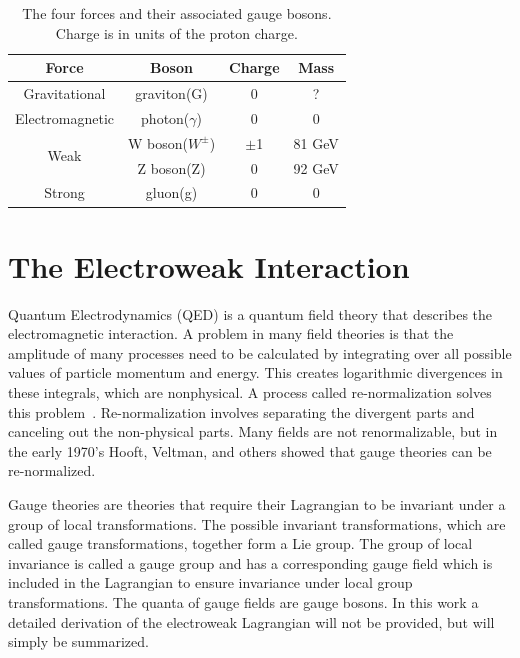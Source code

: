\begin{center}
\begin{table}[htb]
\caption{%
  \small The four forces and their associated gauge bosons. Charge is in units of the proton charge.%
}
\begin{center}
\begin{tabular}{ c c c c }
Force  & Boson    & Charge & Mass \\ \hline
Gravitational & graviton(G) & 0 & ? \\
Electromagnetic & photon($\gamma$) & 0 & 0 \\

\multirow{2}{*}{Weak} & W boson($W^{\pm}$) & $\pm$1 & 81 GeV \\
                      & Z boson(Z) & 0 & 92 GeV \\

Strong & gluon(g) & 0      & 0 \\
\end{tabular}
\end{center}
\label{tab:FundamentalForces}
\end{table}

\end{center}




\section{The Electroweak Interaction}

Quantum Electrodynamics (QED) is a quantum field theory that describes the electromagnetic interaction. A problem in many field theories is that the amplitude of many processes need to be calculated by integrating over all possible values of particle momentum and energy.  This creates logarithmic divergences in these integrals, which are nonphysical. A process called re-normalization solves this problem~\cite{Peskin:1995}.  Re-normalization involves separating the divergent parts and canceling out the non-physical parts.  Many fields are not renormalizable, but in the early 1970's Hooft, Veltman, and others showed that gauge theories can be re-normalized\cite{Hooft:1971}\cite{Hooft:1972}.

Gauge theories are theories that require their Lagrangian to be invariant under a group of local transformations. The possible invariant transformations, which are called gauge transformations, together form a Lie group.  The group of local invariance is called a gauge group and has a corresponding gauge field which is included in the Lagrangian to ensure invariance under local group transformations.  The quanta of gauge fields are gauge bosons\cite{Wiki:Guage_Theory}.  In this work a detailed derivation of the electroweak Lagrangian will not be provided, but will simply be summarized.


